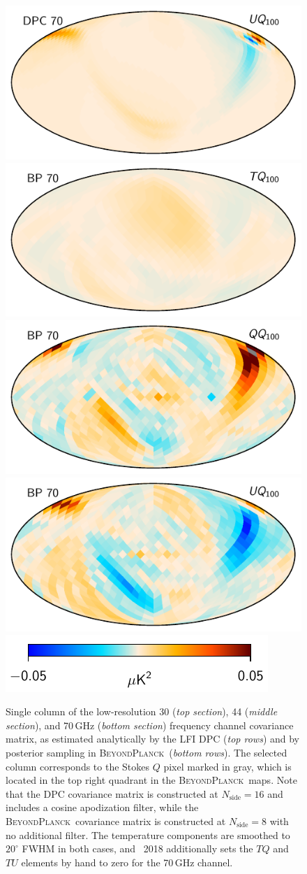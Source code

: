 \documentclass[twocolumn]{aa}
\newcommand{\BP}{\textsc{BeyondPlanck}}
\begin{document}
\begin{figure}[p]
  \includegraphics[width=0.33\linewidth]{figs/ncov_dpc70_pixQ100_BP10_U.pdf}\\
  \includegraphics[width=0.33\linewidth]{figs/ncov_70_pixQ100_BP10_T.pdf}
  \includegraphics[width=0.33\linewidth]{figs/ncov_70_pixQ100_BP10_Q.pdf}
  \includegraphics[width=0.33\linewidth]{figs/ncov_70_pixQ100_BP10_U.pdf}\\
  \includegraphics[width=0.35\linewidth]{figs/colourbar_05uK.pdf}
  \caption{Single column of the low-resolution 30 (\emph{top
      section}), 44 (\emph{middle section}), and 70\,GHz (\emph{bottom
      section}) frequency channel covariance matrix, as estimated
    analytically by the LFI DPC (\emph{top rows}) and by posterior
    sampling in \BP\ (\emph{bottom rows}). The selected column
    corresponds to the Stokes $Q$ pixel marked in gray, which is
    located in the top right quadrant in the \BP\ maps. Note that the
    DPC covariance matrix is constructed at $N_{\mathrm{side}}=16$ and
    includes a cosine apodization filter, while the \BP\ covariance
    matrix is constructed at $N_{\mathrm{side}}=8$ with no additional
    filter. The temperature components are smoothed to $20^{\circ}$
    FWHM in both cases, and \Planck\ 2018 additionally sets the $TQ$
    and $TU$ elements by hand to zero for the 70\,GHz channel. }
  \label{fig:ncov_highlat}
\end{figure}
\end{document}
